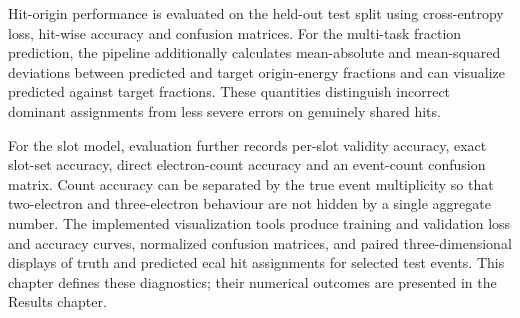 Hit-origin performance is evaluated on the held-out test split using
cross-entropy loss, hit-wise accuracy and confusion matrices. For the
multi-task fraction prediction, the pipeline additionally calculates
mean-absolute and mean-squared deviations between predicted and target
origin-energy fractions and can visualize predicted against target fractions.
These quantities distinguish incorrect dominant assignments from less severe
errors on genuinely shared hits.

For the slot model, evaluation further records per-slot validity accuracy,
exact slot-set accuracy, direct electron-count accuracy and an event-count
confusion matrix. Count accuracy can be separated by the true event
multiplicity so that two-electron and three-electron behaviour are not hidden
by a single aggregate number. The implemented visualization tools produce
training and validation loss and accuracy curves, normalized confusion
matrices, and paired three-dimensional displays of truth and predicted
\gls{ecal} hit assignments for selected test events. This chapter defines
these diagnostics; their numerical outcomes are presented in the Results
chapter.
